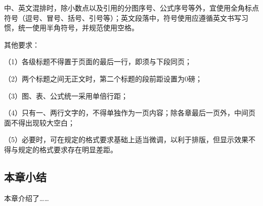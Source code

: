 中、英文混排时，除小数点以及引用的分图序号、公式序号等外，宜使用全角标点符号（逗号、冒号、括号、引号等）；英文段落中，符号使用应遵循英文书写习惯，统一使用半角符号，并规范使用空格。

其他要求：

（1）各级标题不得置于页面的最后一行，即须与下段同页；

（2）两个标题之间无正文时，第二个标题的段前距设置为0磅；

（3）图、表、公式统一采用单倍行距；

（4）只有一、两行文字的，不得单独作为一页内容；除各章最后一页外，中间页面不得出现较大空白；

（5）必要时，可在规定的格式要求基础上适当微调，以利于排版，但显示效果不得与规定的格式要求存在明显差距。


\subsection{本章小结}
本章介绍了……




